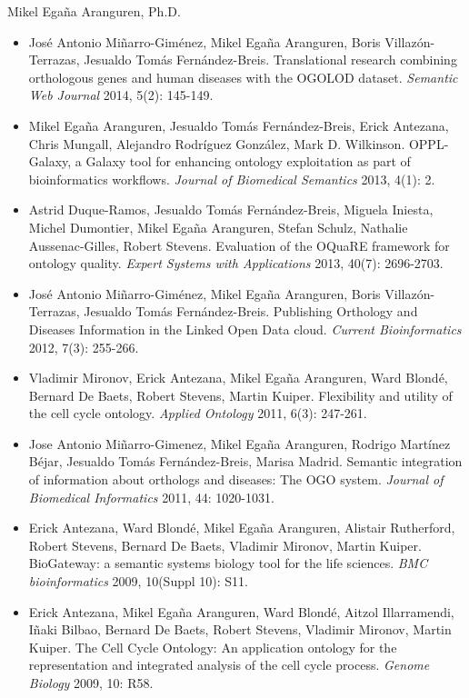 \documentclass[english,11pt,a4paper,oneside]{article}
\begin{document}
\begin{cv}{Mikel Ega\~na Aranguren, Ph.D. }
\begin{itemize}
\item Jos\'e Antonio Mi\~narro-Gim\'enez, Mikel Ega\~na Aranguren, Boris Villaz\'on-Terrazas, Jesualdo Tom\'as Fern\'andez-Breis. Translational research combining orthologous genes and human diseases with the OGOLOD dataset. \textit{Semantic Web Journal} 2014, 5(2): 145-149.

\item Mikel Ega\~na Aranguren, Jesualdo Tom\'as Fern\'andez-Breis, Erick  Antezana, Chris Mu\-nga\-ll, Alejandro Rodr\'iguez Gonz\'alez, Mark D. Wilkinson. OPPL-Galaxy, a Galaxy tool for enhancing ontology exploitation as part of bioinformatics workflows. \textit{Journal of Biomedical Semantics} 2013, 4(1): 2. 

\item Astrid Duque-Ramos, Jesualdo Tom\'as Fern\'andez-Breis, Miguela Iniesta, Michel Dumontier, Mikel Ega\~na Aranguren, Stefan Schulz, Nathalie Aussenac-Gilles, Robert Stevens. Evaluation of the OQuaRE framework for ontology quality. \textit{Expert Systems with Applications} 2013, 40(7): 2696-2703. 

\item Jos\'e Antonio Mi\~narro-Gim\'enez, Mikel Ega\~na Aranguren, Boris Villaz\'on-Terrazas, Jesualdo Tom\'as Fern\'andez-Breis. Publishing Orthology and Diseases Information in the Linked Open Data cloud. \textit{Current Bioinformatics} 2012, 7(3): 255-266.

\item Vladimir Mironov, Erick Antezana, Mikel Ega\~na Aranguren, Ward Blond\'e, Bernard De Baets, Robert Stevens, Martin Kuiper. Flexibility and utility of the cell cycle ontology. \textit{Applied Ontology} 2011, 6(3): 247-261.

\item Jose Antonio Mi\~narro-Gimenez, Mikel Ega\~na Aranguren, Rodrigo Mart\'inez B\'ejar, Jesualdo Tom\'as Fern\'andez-Breis, Marisa Madrid. Semantic integration of information about orthologs and diseases: The OGO system. \textit{Journal of Biomedical Informatics} 2011, 44: 1020-1031.

\item Erick Antezana, Ward Blond\'e, Mikel Ega\~na Aranguren, Alistair Rutherford, Robert Stevens, Bernard De Baets, Vladimir Mironov, Martin Kuiper. BioGateway: a semantic systems biology tool for the life sciences. \textit{BMC bioinformatics} 2009, 10(Suppl 10): S11.

\item Erick Antezana, Mikel Ega\~na Aranguren, Ward Blond\'e, Aitzol Illarramendi, I\~naki Bilbao, Bernard De Baets, Robert Stevens, Vladimir Mironov, Martin Kuiper. The Cell Cycle Ontology: An application ontology for the representation and integrated analysis of the cell cycle process. \textit{Genome Biology} 2009, 10: R58.


\end{itemize}
\end{cv}
\end{document}
